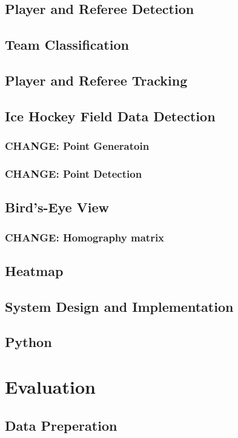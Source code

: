 \documentclass[12pt, letterpaper]{article}
\begin{document}
\subsection{Player and Referee Detection}
\subsection{Team Classification}
\subsection{Player and Referee Tracking}
\subsection{Ice Hockey Field Data Detection}
\subsubsection{\textbf{CHANGE}: Point Generatoin}
\subsubsection{\textbf{CHANGE}: Point Detection}
\subsection{Bird’s-Eye View}
\subsubsection{\textbf{CHANGE}: Homography matrix}
\subsection{Heatmap}
\subsection{System Design and Implementation}
\subsection{Python}
\newpage

\section{Evaluation}

\subsection{Data Preperation}
\end{document}
